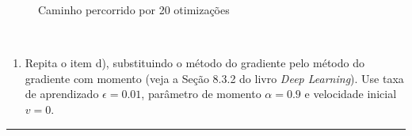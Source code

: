 \documentclass[
  a4paperpaper,
]{article}
\providecommand{\tightlist}{%
  \setlength{\itemsep}{0pt}\setlength{\parskip}{0pt}}\usepackage{longtable,booktabs,array}
\begin{document}
\begin{figure}[H]


\caption{\label{fig-q1f}Caminho percorrido por 20 otimizações}

\end{figure}%

~

\begin{enumerate}
\def\labelenumi{\alph{enumi})}
\setcounter{enumi}{6}
\tightlist
\item
  Repita o item d), substituindo o método do gradiente pelo método do
  gradiente com momento (veja a Seção 8.3.2 do livro \emph{Deep
  Learning}). Use taxa de aprendizado \(\epsilon = 0.01\), parâmetro de
  momento \(\alpha = 0.9\) e velocidade inicial \(v = 0\).
\end{enumerate}

\begin{center}\rule{0.5\linewidth}{0.5pt}\end{center}

~
\end{document}
